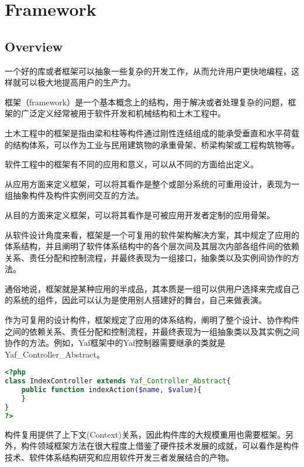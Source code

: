 \part{Framework}



\chapter{Overview}



一个好的库或者框架可以抽象一些复杂的开发工作，从而允许用户更快地编程，这样就可以极大地提高用户的生产力。


框架（framework）是一个基本概念上的结构，用于解决或者处理复杂的问题，框架的广泛定义经常被用于软件开发和机械结构和土木工程中。

土木工程中的框架是指由梁和柱等构件通过刚性连结组成的能承受垂直和水平荷载的结构体系，可以作为工业与民用建筑物的承重骨架、桥梁构架或工程构筑物等。

软件工程中的框架有不同的应用和意义，可以从不同的方面给出定义。

\begin{compactitem}
\item 从应用方面来定义框架，可以将其看作是整个或部分系统的可重用设计，表现为一组抽象构件及构件实例间交互的方法。
\item 从目的方面来定义框架，可以将其看作是可被应用开发者定制的应用骨架。
\end{compactitem}

从软件设计角度来看，框架是一个可复用的软件架构解决方案，其中规定了应用的体系结构，并且阐明了软件体系结构中的各个层次间及其层次内部各组件间的依赖关系、责任分配和控制流程，并最终表现为一组接口，抽象类以及实例间协作的方法。

通俗地说，框架就是某种应用的半成品，其本质是一组可以供用户选择来完成自己的系统的组件，因此可以认为是使用别人搭建好的舞台，自己来做表演。



作为可复用的设计构件，框架规定了应用的体系结构，阐明了整个设计、协作构件之间的依赖关系、责任分配和控制流程，并最终表现为一组抽象类以及其实例之间协作的方法。例如，Yaf框架中的Yaf控制器需要继承的类就是Yaf\_Controller\_Abstract。

\begin{lstlisting}[language=PHP]
<?php
class IndexController extends Yaf_Controller_Abstract{
	public function indexAction($name, $value){
	}
}
?>
\end{lstlisting}

构件复用提供了上下文(Context)关系，因此构件库的大规模重用也需要框架。另外，构件领域框架方法在很大程度上借鉴了硬件技术发展的成就，可以看作是构件技术、软件体系结构研究和应用软件开发三者发展结合的产物。


